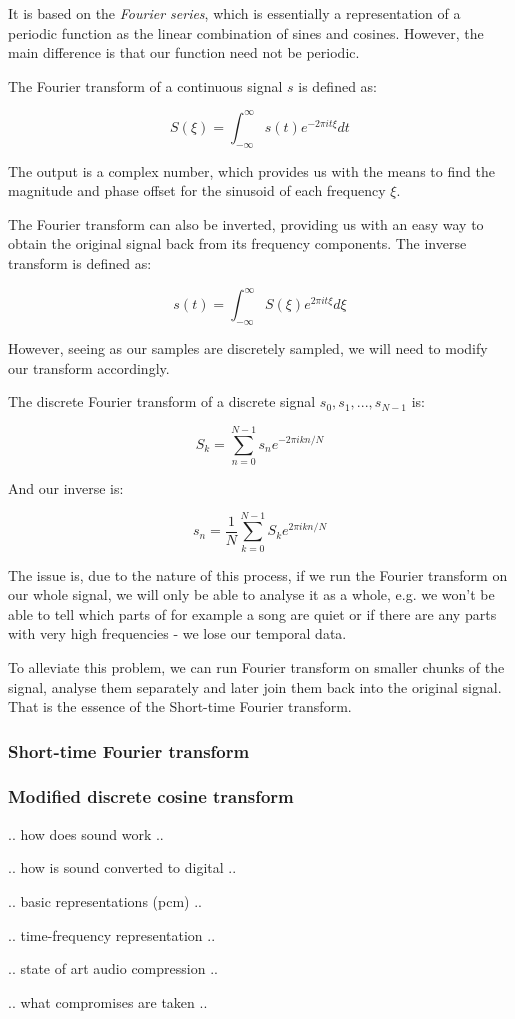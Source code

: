 It is based on the \emph{Fourier series}, which is essentially a representation of a periodic function as the linear combination of sines and cosines. \cite{Shatkay:1995:FTP:864947} However, the main difference is that our function need not be periodic.

The Fourier transform of a continuous signal $s$ is defined as: \cite{Recoskie2014ConstrainedNM}

$$S(\xi) = \int_{-\infty}^{\infty}s(t)e^{-2\pi it\xi}dt$$

The output is a complex number, which provides us with the means to find the magnitude and phase offset for the sinusoid of each frequency $\xi$.

The Fourier transform can also be inverted, providing us with an easy way to obtain the original signal back from its frequency components. The inverse transform is defined as:

$$s(t) = \int_{-\infty}^{\infty}S(\xi)e^{2\pi it\xi}d\xi$$

However, seeing as our samples are discretely sampled, we will need to modify our transform accordingly.

The discrete Fourier transform of a discrete signal $s_0, s_1, ..., s_{N-1}$ is: \cite{Recoskie2014ConstrainedNM}

$$S_k = \sum_{n=0}^{N-1}s_ne^{-2\pi ikn/N}$$

And our inverse is:

$$s_n = \frac1N \sum_{k=0}^{N-1}S_ke^{2\pi ikn/N}$$

The issue is, due to the nature of this process, if we run the Fourier transform on our whole signal, we will only be able to analyse it as a whole, e.g. we won't be able to tell which parts of for example a song are quiet or if there are any parts with very high frequencies - we lose our temporal data.

To alleviate this problem, we can run Fourier transform on smaller chunks of the signal, analyse them separately and later join them back into the original signal. That is the essence of the Short-time Fourier transform.

\subsubsection{Short-time Fourier transform}

\subsubsection{Modified discrete cosine transform}

.. how does sound work ..

.. how is sound converted to digital ..

.. basic representations (pcm) ..

.. time-frequency representation ..

.. state of art audio compression ..

.. what compromises are taken ..

